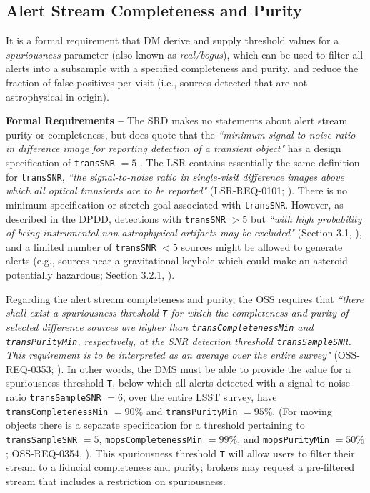 \documentclass[DM,authoryear,toc]{lsstdoc}
\begin{document}
\subsection{Alert Stream Completeness and Purity}\label{ssec:comp_pure}

It is a formal requirement that DM derive and supply threshold values for a {\it spuriousness} parameter (also known as {\it real/bogus}), which can be used to filter all alerts into a subsample with a specified completeness and purity, and reduce the fraction of false positives per visit (i.e., sources detected that are not astrophysical in origin).

{\bf Formal Requirements --} The SRD makes no statements about alert stream purity or completeness, but does quote that the {\it ``minimum signal-to-noise ratio in difference image for reporting detection of a transient object"} has a design specification of {\tt transSNR} $=5$ . The LSR contains essentially the same definition for {\tt transSNR}, {\it ``the signal-to-noise ratio in single-visit difference images above which all optical transients are to be reported"} (LSR-REQ-0101; ). There is no minimum specification or stretch goal associated with {\tt transSNR}. However, as described in the DPDD, detections with {\tt transSNR} $>5$ but {\it ``with high probability of being instrumental non-astrophysical artifacts may be excluded"} (Section 3.1, ), and a limited number of {\tt transSNR} $<5$ sources might be allowed to generate alerts (e.g., sources near a gravitational keyhole which could make an asteroid potentially hazardous; Section 3.2.1, ).

Regarding the alert stream completeness and purity, the OSS requires that {\it ``there shall exist a spuriousness threshold {\tt T} for which the completeness and purity of selected difference sources are higher than {\tt transCompletenessMin} and {\tt transPurityMin}, respectively, at the SNR detection threshold {\tt transSampleSNR}. This requirement is to be interpreted as an average over the entire survey"} (OSS-REQ-0353; ). In other words, the DMS must be able to provide the value for a spuriousness threshold {\tt T}, below which all alerts detected with a signal-to-noise ratio {\tt transSampleSNR} $=6$, over the entire LSST survey, have {\tt transCompletenessMin} $=90\%$ and {\tt transPurityMin} $=95\%$. (For moving objects there is a separate specification for a threshold pertaining to {\tt transSampleSNR} $=5$, {\tt mopsCompletenessMin} $=99\%$, and {\tt mopsPurityMin} $=50\%$; OSS-REQ-0354, ). This spuriousness threshold {\tt T} will allow users to filter their stream to a fiducial completeness and purity; brokers may request a pre-filtered stream that includes a restriction on spuriousness.
\end{document}
